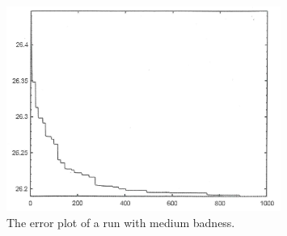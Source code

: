 \documentclass{article}
\theoremstyle{definition}
\begin{document}
  \begin{figure}
    \centering
    \includegraphics[width=0.8\textwidth]{example_error_plot_3}
    \caption{The error plot of a run with medium badness.\label{fig:example_error_plot_3}}
  \end{figure}
\end{document}

